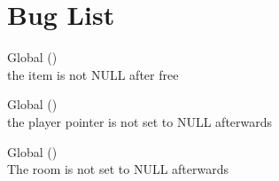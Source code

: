 \chapter{Bug List}
\hypertarget{bug}{}\label{bug}

\begin{DoxyRefList}
\item[Global \doxylink{item_8h_a49ef0c6f220a502dde8f07ec962661c4}{destroy\+\_\+item} (\doxylink{item_8h_a20ec260109c4201081a69c9341a8ad7b}{PITEM})]\hfill \\
\label{bug__bug000001}%
%
the item is not NULL after free  
\item[Global \doxylink{_player_8h_ac7a0bf9ebea241cf1bee9f308c036abd}{destroy\+\_\+player} (\doxylink{_player_8h_aa679c86b77a142a03d861ae90bd07714}{PPLAYER})]\hfill \\
\label{bug__bug000002}%
%
the player pointer is not set to NULL afterwards  
\item[Global \doxylink{room_8h_a305cd436140bfb07bfdfe033ae230916}{destroy\+\_\+room} (\doxylink{room_8h_aa7cf3f05b4aa0d79dece087538df9619}{PROOM})]\hfill \\
\label{bug__bug000003}%
%
The room is not set to NULL afterwards 
\end{DoxyRefList}